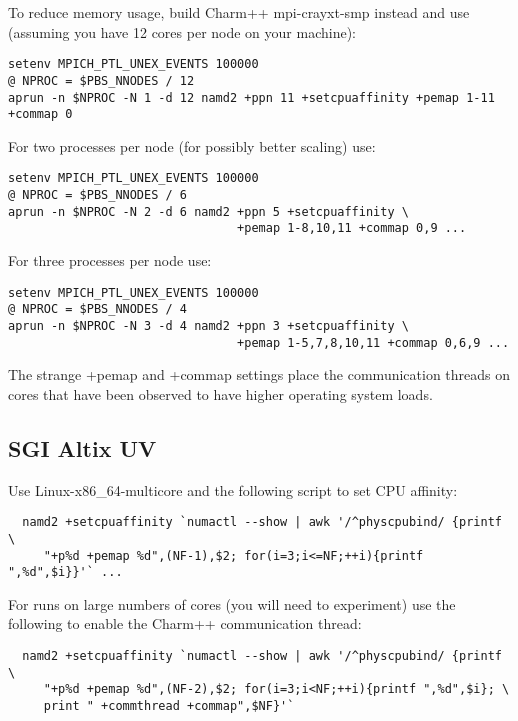 To reduce memory usage, build Charm++ mpi-crayxt-smp instead and use
(assuming you have 12 cores per node on your machine):

\begin{verbatim}
setenv MPICH_PTL_UNEX_EVENTS 100000
@ NPROC = $PBS_NNODES / 12
aprun -n $NPROC -N 1 -d 12 namd2 +ppn 11 +setcpuaffinity +pemap 1-11 +commap 0
\end{verbatim}

For two processes per node (for possibly better scaling) use:

\begin{verbatim}
setenv MPICH_PTL_UNEX_EVENTS 100000
@ NPROC = $PBS_NNODES / 6
aprun -n $NPROC -N 2 -d 6 namd2 +ppn 5 +setcpuaffinity \
                                +pemap 1-8,10,11 +commap 0,9 ...
\end{verbatim}

For three processes per node use:

\begin{verbatim}
setenv MPICH_PTL_UNEX_EVENTS 100000
@ NPROC = $PBS_NNODES / 4
aprun -n $NPROC -N 3 -d 4 namd2 +ppn 3 +setcpuaffinity \
                                +pemap 1-5,7,8,10,11 +commap 0,6,9 ...
\end{verbatim}

The strange +pemap and +commap settings place the communication threads
on cores that have been observed to have higher operating system loads.

\subsection{SGI Altix UV}

Use Linux-x86\_64-multicore and the following script to set CPU affinity:

\begin{verbatim}
  namd2 +setcpuaffinity `numactl --show | awk '/^physcpubind/ {printf \
     "+p%d +pemap %d",(NF-1),$2; for(i=3;i<=NF;++i){printf ",%d",$i}}'` ...
\end{verbatim}

For runs on large numbers of cores (you will need to experiment) use the
following to enable the Charm++ communication thread:

\begin{verbatim}
  namd2 +setcpuaffinity `numactl --show | awk '/^physcpubind/ {printf \
     "+p%d +pemap %d",(NF-2),$2; for(i=3;i<NF;++i){printf ",%d",$i}; \
     print " +commthread +commap",$NF}'`
\end{verbatim}

